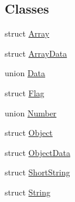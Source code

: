 \subsection*{Classes}
\begin{DoxyCompactItemize}
\item 
struct \hyperlink{structGenericValue_1_1Array}{Array}
\item 
struct \hyperlink{structGenericValue_1_1ArrayData}{Array\+Data}
\item 
union \hyperlink{unionGenericValue_1_1Data}{Data}
\item 
struct \hyperlink{structGenericValue_1_1Flag}{Flag}
\item 
union \hyperlink{unionGenericValue_1_1Number}{Number}
\item 
struct \hyperlink{structGenericValue_1_1Object}{Object}
\item 
struct \hyperlink{structGenericValue_1_1ObjectData}{Object\+Data}
\item 
struct \hyperlink{structGenericValue_1_1ShortString}{Short\+String}
\item 
struct \hyperlink{structGenericValue_1_1String}{String}
\end{DoxyCompactItemize}
